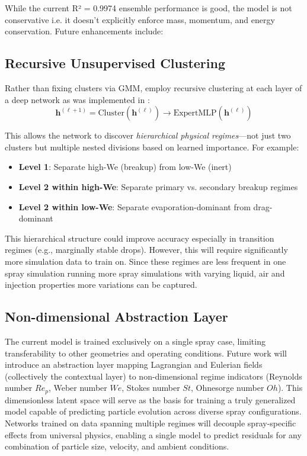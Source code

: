 \documentclass[letterpaper,twocolumn,10pt]{article}
\begin{document}
While the current R² = 0.9974 ensemble performance is good, the model is not conservative i.e. it doesn't explicitly enforce mass, momentum, and energy conservation. Future enhancements include:

\subsection{Recursive Unsupervised Clustering}

Rather than fixing clusters via GMM, employ recursive clustering at each layer of a deep network as was implemented in \cite{Mishra2023}:
\begin{equation}
\mathbf{h}^{(\ell+1)} = \text{Cluster}(\mathbf{h}^{(\ell)}) \to \text{ExpertMLP}(\mathbf{h}^{(\ell)})
\end{equation}

This allows the network to discover \textit{hierarchical physical regimes}---not just two clusters but multiple nested divisions based on learned importance. For example:
\begin{itemize}
    \item \textbf{Level 1}: Separate high-We (breakup) from low-We (inert)
    \item \textbf{Level 2 within high-We}: Separate primary vs. secondary breakup regimes
    \item \textbf{Level 2 within low-We}: Separate evaporation-dominant from drag-dominant
\end{itemize}

This hierarchical structure could improve accuracy especially in transition regimes (e.g., marginally stable drops). However, this will require significantly more simulation data to train on. Since these regimes are less frequent in one spray simulation running more spray simulations with varying liquid, air and injection properties more variations can be captured. 

\subsection{Non-dimensional Abstraction Layer}

The current model is trained exclusively on a single spray case, limiting transferability to other geometries and operating conditions. Future work will introduce an abstraction layer mapping Lagrangian and Eulerian fields (collectively the contextual layer) to non-dimensional regime indicators (Reynolds number $Re_p$, Weber number $We$, Stokes number $St$, Ohnesorge number $Oh$). This dimensionless latent space will serve as the basis for training a truly generalized model capable of predicting particle evolution across diverse spray configurations. Networks trained on data spanning multiple regimes will decouple spray-specific effects from universal physics, enabling a single model to predict residuals for any combination of particle size, velocity, and ambient conditions.
\end{document}
